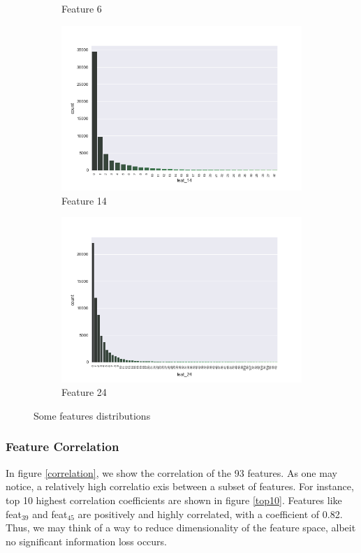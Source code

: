 \documentclass[a4paper,english,12pt]{article}
\begin{document}
\begin{figure}[H]
\begin{subfigure}{0.22\textwidth}
		\caption{Feature 6}
	\end{subfigure}
	\begin{subfigure}{0.22\textwidth}
		\includegraphics[width=\textwidth]{feat_14}
		\caption{Feature 14}
	\end{subfigure}	
	\begin{subfigure}{0.22\textwidth}
		\includegraphics[width=\textwidth]{feat_24}
		\caption{Feature 24}
	\end{subfigure}	
	\caption{Some features distributions}
	\end{figure}


\subsubsection{Feature Correlation}

In figure \ref{correlation}, we show the correlation of the 93 features. As one may notice, a relatively high correlatio exis between a subset of features. For instance, top 10 highest correlation coefficients are shown in  figure \ref{top10}. Features like feat$_39$ and feat$_45$ are positively and highly correlated, with a coefficient of 0.82. Thus, we may think of a way to reduce dimensionality of the feature space, albeit no significant information loss occurs.
\end{document}
